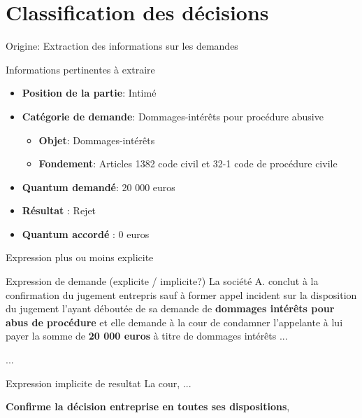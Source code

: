 \documentclass[newPxFont,pagenumber]{beamer}
\begin{document}
\section{Classification des décisions}

\begin{frame}{Origine: Extraction des informations sur les demandes}
\begin{block}{Informations pertinentes à extraire}
\begin{itemize}
\item \textbf{Position de la partie}: Intimé
\item \textbf{Catégorie de demande}: Dommages-intérêts pour procédure abusive
\begin{itemize}
\item \textbf{Objet}: Dommages-intérêts
\item \textbf{Fondement}: Articles 1382 code civil et 32-1 code de procédure civile
\end{itemize}
\item \textbf{Quantum demandé}: 20 000 euros
\item \textbf{Résultat} : Rejet
\item \textbf{Quantum accordé} : 0 euros
\end{itemize}
\end{block}
\end{frame}

\begin{frame}{Expression plus ou moins explicite}
\begin{exampleblock}{Expression de demande (explicite / implicite?)}
La société A. conclut à la confirmation du jugement entrepris sauf à
former appel incident sur la disposition du jugement l'ayant déboutée de sa
demande de \textbf{dommages intérêts pour abus de procédure} et elle demande à la cour de
condamner l'appelante à lui payer la somme de \textbf{20 000 euros} à titre de dommages
intérêts ...


...
\end{exampleblock}

\begin{alertblock}{Expression implicite de resultat}
La cour, ... 

\textbf{Confirme la décision entreprise en toutes ses dispositions},
\end{alertblock}
\end{frame}
\end{document}
